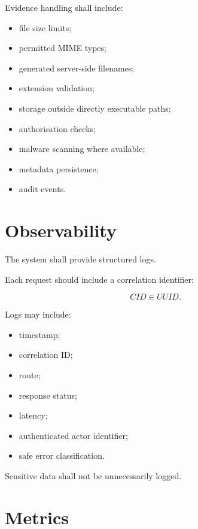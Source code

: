 \documentclass[11pt,a4paper]{article}
\begin{document}
Evidence handling shall include:

\begin{itemize}
    \item file size limits;
    \item permitted MIME types;
    \item generated server-side filenames;
    \item extension validation;
    \item storage outside directly executable paths;
    \item authorisation checks;
    \item malware scanning where available;
    \item metadata persistence;
    \item audit events.
\end{itemize}

\section{Observability}

The system shall provide structured logs.

Each request should include a correlation identifier:

\[
CID \in UUID.
\]

Logs may include:

\begin{itemize}
    \item timestamp;
    \item correlation ID;
    \item route;
    \item response status;
    \item latency;
    \item authenticated actor identifier;
    \item safe error classification.
\end{itemize}

Sensitive data shall not be unnecessarily logged.

\section{Metrics}
\end{document}
